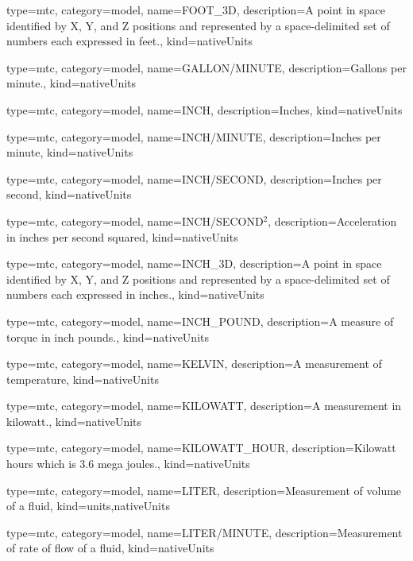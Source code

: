 {
  type=mtc,
  category=model,
  name={FOOT\_3D},
  description={A point in space identified by X, Y, and Z positions and represented by a space-delimited set of numbers each expressed in feet.},
  kind={nativeUnits}
}


{
  type=mtc,
  category=model,
  name={GALLON/MINUTE},
  description={Gallons per minute.},
  kind={nativeUnits}
}


{
  type=mtc,
  category=model,
  name={INCH},
  description={Inches},
  kind={nativeUnits}
}


{
  type=mtc,
  category=model,
  name={INCH/MINUTE},
  description={Inches per minute},
  kind={nativeUnits}
}


{
  type=mtc,
  category=model,
  name={INCH/SECOND},
  description={Inches per second},
  kind={nativeUnits}
}


{
  type=mtc,
  category=model,
  name={INCH/SECOND$^2$},
  description={Acceleration in inches per second squared},
  kind={nativeUnits}
}


{
  type=mtc,
  category=model,
  name={INCH\_3D},
  description={A point in space identified by X, Y, and Z positions and represented by a space-delimited set of numbers each expressed in inches.},
  kind={nativeUnits}
}


{
  type=mtc,
  category=model,
  name={INCH\_POUND},
  description={A measure of torque in inch pounds.},
  kind={nativeUnits}
}


{
  type=mtc,
  category=model,
  name={KELVIN},
  description={A measurement of temperature},
  kind={nativeUnits}
}


{
  type=mtc,
  category=model,
  name={KILOWATT},
  description={A measurement in kilowatt.},
  kind={nativeUnits}
}


{
  type=mtc,
  category=model,
  name={KILOWATT\_HOUR},
  description={Kilowatt hours which is 3.6 mega joules.},
  kind={nativeUnits}
}


{
  type=mtc,
  category=model,
  name={LITER},
  description={Measurement of volume of a fluid},
  kind={units,nativeUnits}
}


{
  type=mtc,
  category=model,
  name={LITER/MINUTE},
  description={Measurement of rate of flow of a fluid},
  kind={nativeUnits}
}


